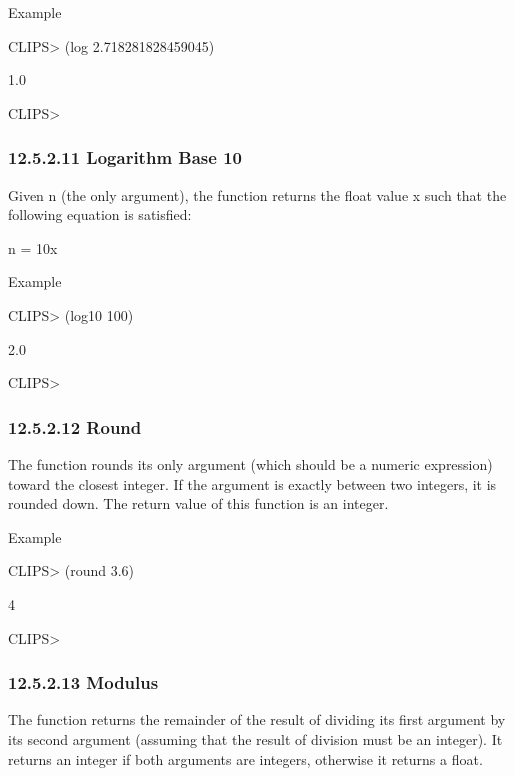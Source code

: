 \documentclass[letterpaper,10pt,english]{sphinxmanual}
\begin{document}
Example

CLIPS\textgreater{} (log 2.718281828459045)

1.0

CLIPS\textgreater{}


\subsubsection{12.5.2.11 Logarithm Base 10}
\label{\detokenize{actions:logarithm-base-10}}
Given n (the only argument), the  function returns the float
value x such that the following equation is satisfied:

n = 10x


\begin{sphinxVerbatim}[commandchars=\\\{\}]
 
\end{sphinxVerbatim}

Example

CLIPS\textgreater{} (log10 100)

2.0

CLIPS\textgreater{}


\subsubsection{12.5.2.12 Round}
\label{\detokenize{actions:round}}
The  function rounds its only argument (which should be a
numeric expression) toward the closest integer. If the argument is
exactly between two integers, it is rounded down. The return value of
this function is an integer.


\begin{sphinxVerbatim}[commandchars=\\\{\}]
 
\end{sphinxVerbatim}

Example

CLIPS\textgreater{} (round 3.6)

4

CLIPS\textgreater{}


\subsubsection{12.5.2.13 Modulus}
\label{\detokenize{actions:modulus}}
The  function returns the remainder of the result of dividing its
first argument by its second argument (assuming that the result of
division must be an integer). It returns an integer if both arguments
are integers, otherwise it returns a float.
\end{document}
